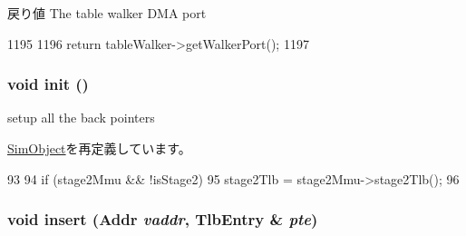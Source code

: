\begin{DoxyReturn}{戻り値}
The table walker DMA port 
\end{DoxyReturn}



\begin{DoxyCode}
1195 {
1196     return tableWalker->getWalkerPort();
1197 }
\end{DoxyCode}
\hypertarget{classArmISA_1_1TLB_a02fd73d861ef2e4aabb38c0c9ff82947}{
\subsubsection[{init}]{\setlength{\rightskip}{0pt plus 5cm}void init ()}}
\label{classArmISA_1_1TLB_a02fd73d861ef2e4aabb38c0c9ff82947}


setup all the back pointers 

\hyperlink{classSimObject_a02fd73d861ef2e4aabb38c0c9ff82947}{SimObject}を再定義しています。


\begin{DoxyCode}
93 {
94     if (stage2Mmu && !isStage2)
95         stage2Tlb = stage2Mmu->stage2Tlb();
96 }
\end{DoxyCode}
\hypertarget{classArmISA_1_1TLB_a0a32b96ef1142ca48fa347d06b5d2436}{
\subsubsection[{insert}]{\setlength{\rightskip}{0pt plus 5cm}void insert ({\bf Addr} {\em vaddr}, \/  {\bf TlbEntry} \& {\em pte})}}
\label{classArmISA_1_1TLB_a0a32b96ef1142ca48fa347d06b5d2436}



